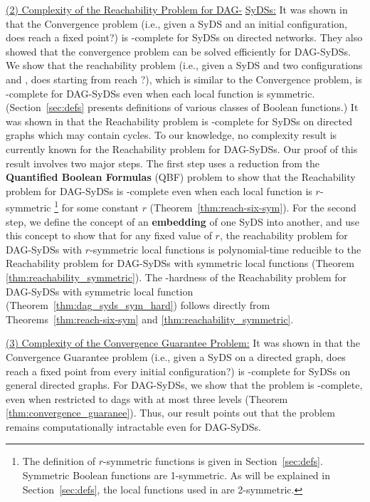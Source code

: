 \noindent
\underline{(2) Complexity of the Reachability Problem for DAG-}\newline
\underline{SyDSs:} 
It was shown in
\cite{Chistikov-etal-2020} that the Convergence problem
(i.e., given a SyDS \cals{} and an initial configuration,
does \cals{} reach a fixed point?) is \cpsp-complete
for SyDSs on directed networks.
They also showed that the convergence problem can be solved efficiently
for DAG-SyDSs.
We show that the reachability problem
(i.e., given a SyDS \cals{} and two configurations \calc{} and \cald{},
does \cals{} starting from \calc{} reach \cald{}?),
which is similar to the Convergence problem, 
is \cpsp-complete for DAG-SyDSs even
when each local function is symmetric.
(Section~\ref{sec:defs} presents definitions of various classes
of Boolean functions.)
It was shown in \cite{OU-2017} that the Reachability
problem is \cpsp-complete for SyDSs on directed graphs 
which may contain cycles.
To our knowledge, no complexity result is currently known for
the Reachability problem for DAG-SyDSs.
Our proof of this result involves two major steps.
The first step uses a reduction from the \textbf{Quantified Boolean Formulas}
(QBF) problem \cite{GJ-1979} to show that the Reachability problem for DAG-SyDSs is
\cpsp-complete even when each local function is $r$-symmetric
\footnote{The definition of $r$-symmetric functions is given in
Section~\ref{sec:defs}. Symmetric Boolean functions
are 1-symmetric. As will be explained in Section~\ref{sec:defs},
the local functions used in \cite{Chistikov-etal-2020} are
2-symmetric.}
for some constant $r$ (Theorem~\ref{thm:reach-six-sym}).
For the second step,
we define the concept of an \textbf{embedding} of one SyDS into another,
and use this concept to show that
for any fixed value of $r$, 
the reachability problem for DAG-SyDSs with $r$-symmetric local functions 
is polynomial-time reducible to the Reachability problem for DAG-SyDSs with
symmetric  local functions (Theorem \ref{thm:reachability_symmetric}).
The \cpsp-hardness of the Reachability problem for DAG-SyDSs with 
symmetric local function (Theorem~\ref{thm:dag_syds_sym_hard})
follows directly from Theorems~\ref{thm:reach-six-sym} and 
\ref{thm:reachability_symmetric}.

\smallskip

\noindent
\underline{(3) Complexity of the Convergence Guarantee Problem:}
It was shown in \cite{Chistikov-etal-2020} that
the Convergence Guarantee problem 
(i.e., given a SyDS \cals{} on
a directed graph, does \cals{} reach a fixed point from every
initial configuration?)  
is \cpsp-complete for SyDSs on general directed graphs.
For DAG-SyDSs, we show that the problem is \cconp-complete,
even when restricted to dags with at most  three levels 
(Theorem \ref{thm:convergence_guaranee}).
Thus, our result points out that the problem remains 
computationally intractable even for DAG-SyDSs.


